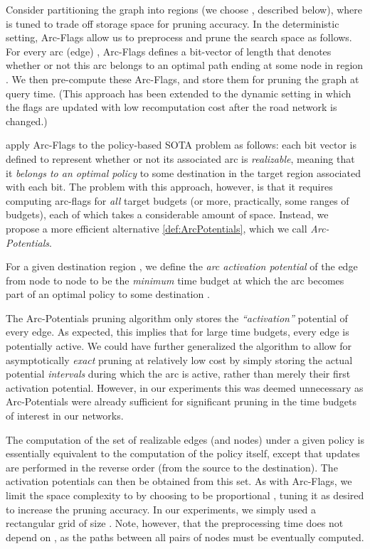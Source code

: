 \documentclass[oribibl]{llncs}
\begin{document}
		Consider partitioning the graph  into  regions (we choose , described below),
		where  is tuned to trade off storage space for pruning accuracy.
		In the deterministic setting, Arc-Flags allow us to preprocess and prune the search space as follows.
		For every arc (edge) , Arc-Flags defines a bit-vector of length  that denotes whether
		or not this arc belongs to an optimal path ending at some node in region .
		We then pre-compute these Arc-Flags, and store them for pruning the graph at query time.
		(This approach has been extended to the dynamic setting \cite{d2011dynamic}
		in which the flags are updated with low recomputation cost after the road network is changed.)

		\citet{sabran2014precomputation} apply Arc-Flags to the policy-based SOTA problem as follows:
		each bit vector is defined to represent whether or not its associated arc is \textit{realizable},
		meaning that it \textit{belongs to an optimal policy} to some destination
		in the target region associated with each bit.
		The problem with this approach, however, is that it requires computing arc-flags for \textit{all}
		target budgets (or more, practically, some ranges of budgets), each of which takes a considerable amount of space.
		Instead, we propose a more efficient alternative \ref{def:ArcPotentials}, which we call \textit{Arc-Potentials}.
		\begin{definition}
			\label{def:ArcPotentials}
			For a given destination region ,
			we define the \textit{arc activation potential}  of the edge from
			node  to node  to be the
			\textit{minimum} time budget at which the arc becomes part of an optimal policy to some
			destination .
		\end{definition}

		The Arc-Potentials pruning algorithm only stores the \textit{``activation''} potential of every edge.
		As expected, this implies that for large time budgets, every edge is potentially active.
		We could have further generalized the algorithm to allow for asymptotically \textit{exact}
		pruning at relatively low cost by simply storing the actual potential \textit{intervals}
		during which the arc is active, rather than merely their first activation potential.
		However, in our experiments this was deemed unnecessary as Arc-Potentials were already
		sufficient for significant pruning in the time budgets of interest in our networks.

		The computation of the set of realizable edges (and nodes) under a given policy
		is essentially equivalent to the computation of the policy itself,
		except that updates are performed in the reverse order (from the source to the destination).
		The activation potentials  can then be obtained from this set.
		As with Arc-Flags, we limit the space complexity to 
		by choosing  to be proportional ,
		tuning it as desired to increase the pruning accuracy.
		In our experiments, we simply used a rectangular grid of size .
		Note, however, that the preprocessing time does not depend on ,
		as the paths between all  pairs of nodes must be eventually computed.
\end{document}
